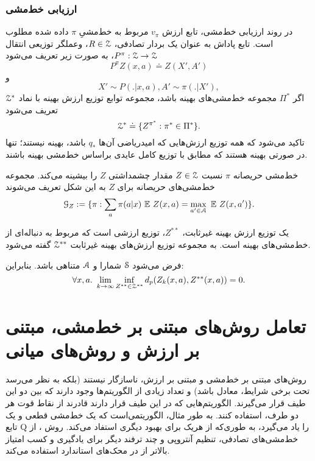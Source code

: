 \subsubsection{ارزیابی خط‌مشی}
در روند ارزیابی خط‌مشی، تابع ارزش
$v_\pi$
مربوط به خط‌مشیِ $\pi$ داده شده مطلوب است.
تابع پاداش به عنوان یک بردار تصادفی، 
$R \in \EuScript{Z}$،
وعملگر توزیعی انتقال 
$P^\pi : \EuScript{Z} \rightarrow \EuScript{Z}$،
به صورت زیر تعریف می‌شود$$P^{\pi} Z(x,a) \doteq Z(X',A')$$و$$X' \sim P(.|x,a), A'\sim \pi (.|X'),$$
اگر 
$\Pi^*$
مجموعه‌ خط‌مشی‌های بهینه باشد، 
مجموعه توابع توزیع ارزش بهینه با نماد $\EuScript{Z}^*$ تعریف می‌شود
$$\EuScript{Z}^* \doteq \{{Z^{\pi^{*}} : \pi^* \in \Pi^*\} }.$$
تاکید می‌شود که همه توزیع ارزش‌هایی که امیدریاضی آن‌ها
 $q_*$ 
باشد، بهینه نیستند؛ تنها در صورتی بهینه هستند که مطابق با توزیع کامل عایدی بر‌اساس خط‌مشی بهینه باشند.

خط‌مشی حریصانه
$\pi$
نسبت
$Z \in \EuScript{Z}$
مقدار چشمداشتی
$Z$
 را بیشینه می‌کند.
 مجموعه خط‌مشی‌های حریصانه برای 
 $Z$
 به این شکل تعریف می‌شوند
 $$\EuScript{G}_Z := \lbrace \pi : \sum_{a} \pi (a|x) \ \mathbb{E} \ Z(x,a) = \max_{a' \in \EuScript{A}} \ \mathbb{E} \ Z(x,a') \rbrace.$$

یک توزیع ارزش بهینه غیرثابت، $Z^{**}$، توزیع ارزشی‌ است که مربوط به دنباله‌ای از خط‌مشی‌های بهینه است. به مجموعه‌ توزیع ارزش‌های بهینه غیرثابت 
$ \EuScript{Z}^{**} $
 گفته می‌شود.

فرض می‌شود 
$\EuScript{S}$
شمارا و 
$\EuScript{A}$
متناهی باشد.
بنابراین:
$$\forall x,a. \ \lim_{k\to\infty} \inf_{Z^{**} \in \EuScript{Z}^{**}} d_p (Z_k (x,a), Z^{**}(x,a)) = 0.$$
\section{تعامل روش‌های مبتنی بر خط‌مشی، مبتنی بر ارزش و روش‌های میانی}
روش‌های مبتنی بر خط‌مشی و مبتنی بر ارزش،
ناسازگار نیستند (بلکه به نظر می‌رسد تحت برخی شرایط، معادل باشد) و تعداد زیادی از الگوریتم‌ها وجود دارند که بین دو  این طیف قرار می‌گیرند. الگوریتم‌هایی که در این طیف قرار دارند قادرند از نقاط قوت  هر دو طرف، استفاده کنند.
به طور مثال، 
الگوریتمی‌است که  یک خط‌مشی قطعی و یک تابع Q را یاد می‌گیرد،
به ‌طوری‌که از هریک  برای بهبود دیگری استفاد می‌کند. روش
،
از خط‌مشی‌های تصادفی، تنظیم آنتروپی  و چند ترفند دیگر برای  یادگیری و کسب امتیاز بالاتر از 
در محک‌های استاندارد
استفاده می‌کند.
